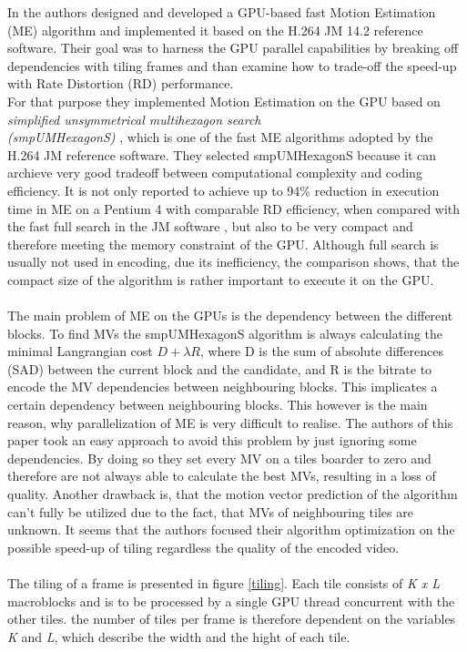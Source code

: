 In \cite{Paper1} the authors designed and developed a GPU-based fast Motion Estimation (ME) algorithm and implemented it based on the H.264 JM 14.2 reference software. 
Their goal was to harness the GPU parallel capabilities by breaking off dependencies with tiling frames and than examine how to trade-off the speed-up with Rate Distortion (RD) performance.\\
For that purpose they implemented Motion Estimation on the GPU based on \textit{simplified unsymmetrical multihexagon search \\(smpUMHexagonS)} \cite{yi2005improved}, 
which is one of the fast ME algorithms adopted by the H.264 JM reference software. 
They selected smpUMHexagonS because it can archieve very good tradeoff between computational complexity and coding efficiency. 
It is not only reported to achieve up to 94\% reduction in execution time in ME on a Pentium 4 with comparable RD efficiency, 
when compared with the fast full search in the JM software \cite{yi2005improved}, but also to be very compact and 
therefore meeting the memory constraint of the GPU. Although full search is usually not used in encoding, due its inefficiency, 
the comparison shows, that the compact size of the algorithm is rather important to execute it on the GPU.\\
%
\\
The main problem of ME on the GPUs is the dependency between the different blocks. To find MVs the smpUMHexagonS algorithm is always calculating the minimal Langrangian cost $D + \lambda R$, where D is the sum of
absolute differences (SAD) between the current block and the candidate, and R is the bitrate
to encode the MV dependencies between neighbouring blocks. This implicates a certain dependency between neighbouring blocks. This however is the main reason, why parallelization of ME is very difficult to realise.
The authors of this paper took an easy approach to avoid this problem by just ignoring some dependencies. 
By doing so they set every MV on a tiles boarder to zero and therefore are not always able to calculate the best MVs, resulting in a loss of quality. Another drawback is, 
that the motion vector prediction of the algorithm can't fully be utilized due to the fact, that MVs of neighbouring tiles are unknown. 
It seems that the authors focused their algorithm optimization on the possible speed-up of tiling regardless the quality of the encoded video.\\
\\
The tiling of a frame is presented in figure \ref{tiling}. Each tile consists of \textit{K x L} macroblocks and is to be processed by a single GPU thread concurrent with the other tiles. 
the number of tiles per frame is therefore dependent on the variables \textit{K} and \textit{L}, which describe the width and the hight of each tile.

